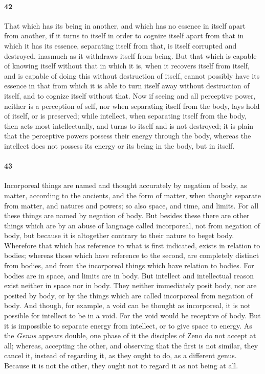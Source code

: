 \documentclass[12pt]{article}
\begin{document}
\paragraph{42} That which has its being in another, and which has no es\-sence
in itself apart from another, if it turns to itself in order to cognize itself
apart from that in which it has its es\-sence, separating itself from that, is
itself corrupted and destroyed, inasmuch as it withdraws itself from being. But
that which is capable of knowing itself without that in which it is, when it
recovers itself from itself, and is capable of doing this without destruction
of itself, cannot possibly have its es\-sence in that from which it is able to
turn itself away without destruction of itself, and to cognize itself without
that. Now if seeing and all perceptive power, neither is a perception of self,
nor when separating itself from the body, lays hold of itself, or is preserved;
while intellect, when separating itself from the body, then acts most
intellectually, and turns to itself and is not destroyed; it is plain that the
perceptive powers possess their energy through the body, whereas the intellect
does not possess its energy or its being in the body, but in itself.

\paragraph{43} Incorporeal things are named and thought accurately by negation
of body, as matter, according to the ancients, and the form of matter, when
thought separate from matter, and natures and powers; so also space, and time,
and limits. For all these things are named by negation of body. But besides
these there are other things which are by an abuse of language called
incorporeal, not from negation of body, but because it is altogether contrary
to their nature to beget body. Wherefore that which has reference to what is
first indicated, exists in relation to bodies; whereas those which have
reference to the second, are completely distinct from bodies, and from the
incorporeal things which have relation to bodies. For bodies are in space, and
limits are in body. But intellect and intellectual reason exist neither in
space nor in body. They neither immediately posit body, nor are posited by
body, or by the things which are called incorporeal from negation of body. And
though, for example, a void can be thought as incorporeal, it is not possible
for intellect to be in a void. For the void would be receptive of body. But it
is impossible to separate energy from intellect, or to give space to energy. As
the \textit{Genus} appears double, one phase of it the disciples of Zeno do not
accept at all; whereas, accepting the other, and observing that the first is
not similar, they cancel it, instead of regarding it, as they ought to do, as a
different genus. Because it is not the other, they ought not to regard it as
not being at all.
\end{document}
